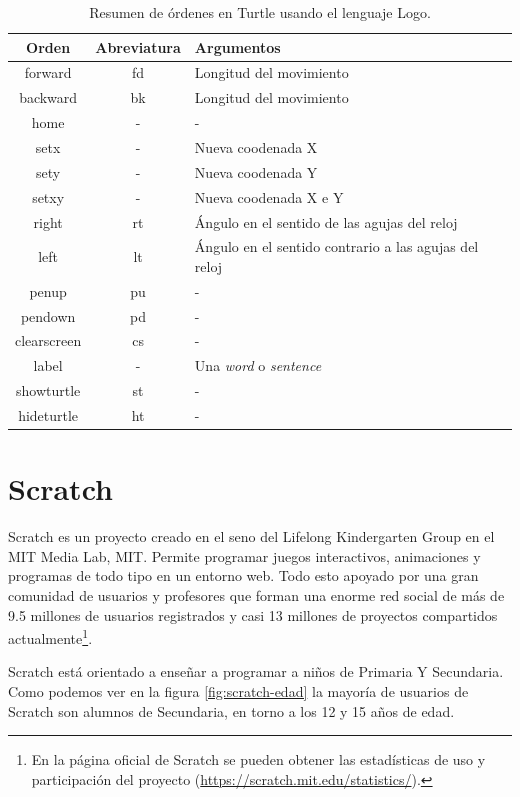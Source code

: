 \begin{table}[!ht]
	\begin{centering}
		\begin{tabular}{c|c|l}
Orden & Abreviatura & Argumentos\\
\hline
forward & fd & Longitud del movimiento\\
backward & bk & Longitud del movimiento\\
home & - & -\\
setx & - & Nueva coodenada X\\
sety & - & Nueva coodenada Y\\
setxy & - & Nueva coodenada X e Y\\
right & rt & Ángulo en el sentido de las agujas del reloj\\
left & lt & Ángulo en el sentido contrario a las agujas del reloj\\
penup & pu & -\\
pendown & pd & -\\
clearscreen & cs & -\\
label & - & Una \emph{word} o \emph{sentence}\\
showturtle & st & -\\
hideturtle & ht & -\\
\end{tabular}
	\caption{Resumen de órdenes en Turtle usando el lenguaje Logo.}
		\label{tab:turtle-lenguaje}
	\end{centering}
\end{table}


\section{Scratch}
\label{sec:scratch}


Scratch\cite{scratch} es un proyecto creado en el seno del Lifelong Kindergarten Group en el MIT Media Lab, \acrfull{MIT}. Permite programar juegos interactivos, animaciones y programas de todo tipo en un entorno web. Todo esto apoyado por una gran comunidad de usuarios y profesores que forman una enorme red social de más de 9.5 millones de usuarios registrados y casi 13 millones de proyectos compartidos actualmente\footnote{En la página oficial de Scratch se pueden obtener las estadísticas de uso y participación del proyecto (\url{https://scratch.mit.edu/statistics/}).}.

Scratch está orientado a enseñar a programar a niños de Primaria Y Secundaria. Como podemos ver en la figura \ref{fig:scratch-edad} la mayoría de usuarios de Scratch son alumnos de Secundaria, en torno a los 12 y 15 años de edad.

